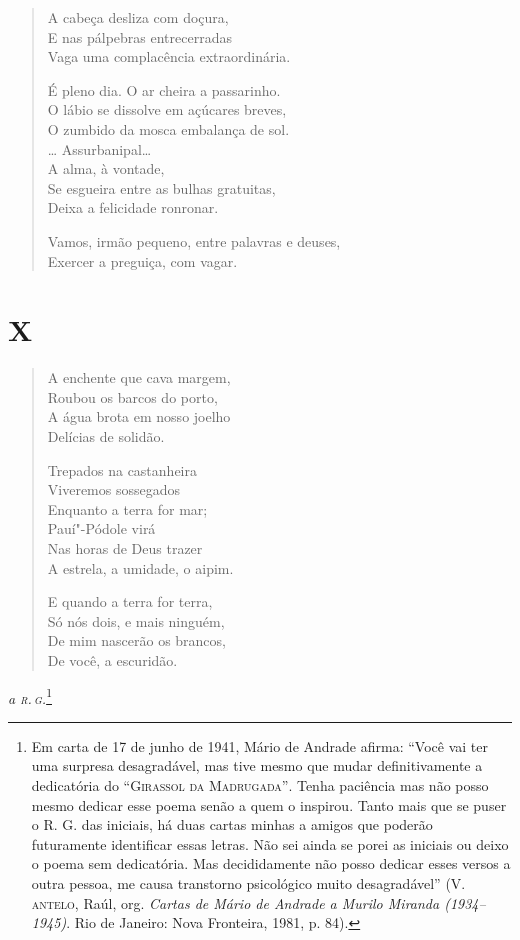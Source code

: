 \begin{verse}
A cabeça desliza com doçura,\\
E nas pálpebras entrecerradas\\
Vaga uma complacência extraordinária.

É pleno dia. O ar cheira a passarinho.\\
O lábio se dissolve em açúcares breves,\\
O zumbido da mosca embalança de sol.\\
\ldots{} Assurbanipal\ldots{}\\
A alma, à vontade,\\
Se esgueira entre as bulhas gratuitas,\\
Deixa a felicidade ronronar.

Vamos, irmão pequeno, entre palavras e deuses,\\
Exercer a preguiça, com vagar.
\end{verse}

\medskip
\section*{X}

\begin{verse}
A enchente que cava margem,\\
Roubou os barcos do porto,\\
A água brota em nosso joelho\\
Delícias de solidão.

Trepados na castanheira\\
Viveremos sossegados\\
Enquanto a terra for mar;\\
Pauí"-Pódole virá\\
Nas horas de Deus trazer\\
A estrela, a umidade, o aipim.

E quando a terra for terra,\\
Só nós dois, e mais ninguém,\\
De mim nascerão os brancos,\\
De você, a escuridão.
\end{verse}


\begin{flushright}
\emph{a \textsc{r.\,g.}}\footnote[*]{Em carta de 17 de junho de 1941, Mário de
  Andrade afirma: ``Você vai ter uma surpresa desagradável, mas tive
  mesmo que mudar definitivamente a dedicatória do ``\textsc{Girassol da
  Madrugada''}. Tenha paciência mas não posso mesmo dedicar esse poema
  senão a quem o inspirou. Tanto mais que se puser o R. G. das iniciais,
  há duas cartas minhas a amigos que poderão futuramente identificar
  essas letras. Não sei ainda se porei as iniciais ou deixo o poema sem
  dedicatória. Mas decididamente não posso dedicar esses versos a outra
  pessoa, me causa transtorno psicológico muito desagradável'' (V.
  \textsc{antelo}, Raúl, org. \emph{Cartas de Mário de Andrade a Murilo Miranda
  (1934--1945)}. Rio de Janeiro: Nova Fronteira, 1981, p. 84).}
\end{flushright}

